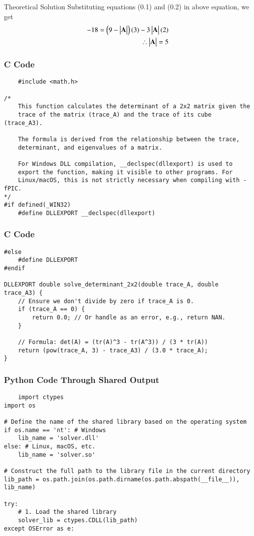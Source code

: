 \documentclass{beamer}
\begin{document}
\begin{frame}{Theoretical Solution}
Substituting equations (0.1) and (0.2) in above equation, we get
\begin{align}
    -18=\left(9-\begin{vmatrix}\mathbf{A}\end{vmatrix}\right)(3)-3\begin{vmatrix}\mathbf{A}\end{vmatrix}(2)\\
    \therefore \begin{vmatrix}\mathbf{A}\end{vmatrix}=5
\end{align}
\end{frame}
\begin{frame}[fragile]
\frametitle{C Code}
\begin{lstlisting}
    #include <math.h>

/*
    This function calculates the determinant of a 2x2 matrix given the
    trace of the matrix (trace_A) and the trace of its cube (trace_A3).

    The formula is derived from the relationship between the trace,
    determinant, and eigenvalues of a matrix.

    For Windows DLL compilation, __declspec(dllexport) is used to
    export the function, making it visible to other programs. For
    Linux/macOS, this is not strictly necessary when compiling with -fPIC.
*/
#if defined(_WIN32)
    #define DLLEXPORT __declspec(dllexport)
    \end{lstlisting}
    \end{frame}
    \begin{frame}[fragile]
    \frametitle{C Code}
    \begin{lstlisting}
#else
    #define DLLEXPORT
#endif

DLLEXPORT double solve_determinant_2x2(double trace_A, double trace_A3) {
    // Ensure we don't divide by zero if trace_A is 0.
    if (trace_A == 0) {
        return 0.0; // Or handle as an error, e.g., return NAN.
    }
    
    // Formula: det(A) = (tr(A)^3 - tr(A^3)) / (3 * tr(A))
    return (pow(trace_A, 3) - trace_A3) / (3.0 * trace_A);
}
    \end{lstlisting}
    \end{frame}
    \begin{frame}[fragile]
    \frametitle{Python Code Through Shared Output}
    \begin{lstlisting}
    import ctypes
import os

# Define the name of the shared library based on the operating system
if os.name == 'nt': # Windows
    lib_name = 'solver.dll'
else: # Linux, macOS, etc.
    lib_name = 'solver.so'

# Construct the full path to the library file in the current directory
lib_path = os.path.join(os.path.dirname(os.path.abspath(__file__)), lib_name)

try:
    # 1. Load the shared library
    solver_lib = ctypes.CDLL(lib_path)
except OSError as e:
    \end{lstlisting}
    \end{frame}
\end{document}
